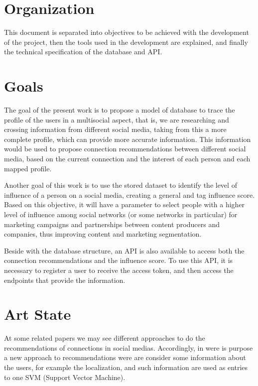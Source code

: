 \section{Organization}
This document is separated into objectives to be achieved with the development of the project, then the tools used in the development are explained, and finally the technical specification of the database and API.

\section{Goals}

The goal of the present work is to propose a model of database to trace the profile of the users in a multisocial aspect, that is, we are researching and crossing information from different social media, taking from this a more complete profile, which can provide more accurate information. This information would be used to propose connection recommendations between different social media, based on the current connection and the interest of each person and each mapped profile.

Another goal of this work is to use the stored dataset to identify the level of influence of a person on a social media, creating a general and tag influence score. Based on this objective, it will have a parameter to select people with a higher level of influence among social networks (or some networks in particular) for marketing campaigns and partnerships between content producers and companies, thus improving content and marketing segmentation. 

Beside with the database structure, an API is also available to access both the connection recommendations and the influence score. To use this API, it is necessary to register a user to receive the access token, and then access the endpoints that provide the information.

\section{Art State}

At some related papers we may see different approaches to do the recommendations of connections in social medias. Accordingly, in \cite{multi-feature-recommendation} were is purpose a new approach to recommendations were are consider some information about the users, for example the localization, and such information are used as entries to one SVM (Support Vector Machine).

